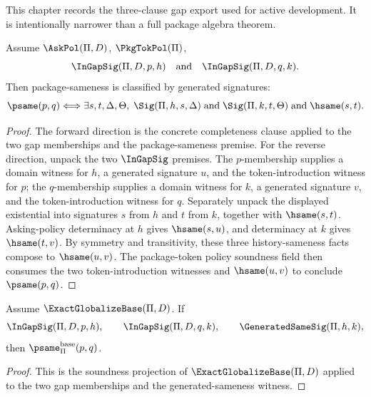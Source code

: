 This chapter records the three-clause gap export used for active development. It is intentionally narrower than a full package algebra theorem.

\begin{theorem}
\label{thm:internalized-globalize-classifies-by-signatures}
Assume $\AskPol(\Pi,D)$, $\PkgTokPol(\Pi)$,
$$
  \InGapSig(\Pi,D,p,h)
  \quad\text{and}\quad
  \InGapSig(\Pi,D,q,k).
$$
Then package-sameness is classified by generated signatures:
$$
  \psame(p,q)
  \Longleftrightarrow
  \exists s,t,\Delta,\Theta,\;
  \Sig(\Pi,h,s,\Delta)
  \;\text{and}\;
  \Sig(\Pi,k,t,\Theta)
  \;\text{and}\;
  \hsame(s,t).
$$
\end{theorem}

\begin{proof}
The forward direction is the concrete completeness clause applied to the two gap memberships and the package-sameness premise. For the reverse direction, unpack the two $\InGapSig$ premises. The $p$-membership supplies a domain witness for $h$, a generated signature $u$, and the token-introduction witness for $p$; the $q$-membership supplies a domain witness for $k$, a generated signature $v$, and the token-introduction witness for $q$. Separately unpack the displayed existential into signatures $s$ from $h$ and $t$ from $k$, together with $\hsame(s,t)$. Asking-policy determinacy at $h$ gives $\hsame(s,u)$, and determinacy at $k$ gives $\hsame(t,v)$. By symmetry and transitivity, these three history-sameness facts compose to $\hsame(u,v)$. The package-token policy soundness field then consumes the two token-introduction witnesses and $\hsame(u,v)$ to conclude $\psame(p,q)$.
\end{proof}

\begin{theorem}
\label{thm:exact-globalize-base-soundness-exports-base}
Assume $\ExactGlobalizeBase(\Pi,D)$. If
$$
\InGapSig(\Pi,D,p,h),
\qquad
\InGapSig(\Pi,D,q,k),
\qquad
\GeneratedSameSig(\Pi,h,k),
$$
then $\psame_{\Pi}^{\mathrm{base}}(p,q)$.
\end{theorem}
\begin{proof}
This is the soundness projection of $\ExactGlobalizeBase(\Pi,D)$ applied to the two gap memberships and the generated-sameness witness.
\end{proof}

